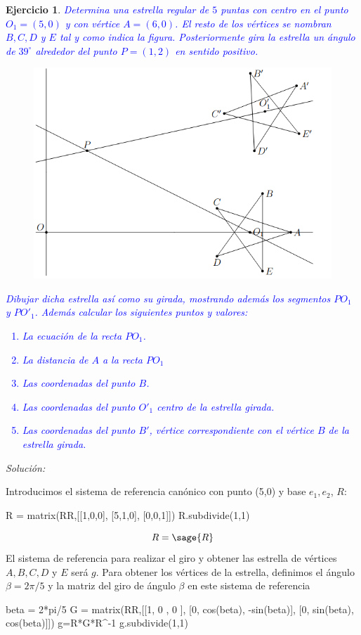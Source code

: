 \documentclass{amsart}
\newtheorem{ejer}{Ejercicio}
\begin{document}
\begin{ejer}
\textcolor{blue}{Determina una estrella regular de $5$ puntas con centro en el punto $O_1 = (5,0)$ y con vértice $A = (6,0)$. El resto de los vértices se nombran $B, C, D$ y $E$ tal y como indica la figura. Posteriormente gira la estrella un ángulo de $39^\circ $ alrededor del punto $P = (1,2)$ en sentido positivo.}

\begin{figure}[H]
\centering
\includegraphics[width = 12cm]{estrella1.png}
\end{figure}

\textcolor{blue}{Dibujar dicha estrella así como su girada, mostrando además los segmentos $PO_1$ y $PO'_1$. Además calcular los siguientes puntos y valores:
\begin{enumerate} 
\item[a)] La ecuación de la recta $PO_1$.
\item[b)] La distancia de $A$ a la recta $PO_1$
\item[c)] Las coordenadas del punto $B$.
\item[d)] Las coordenadas del punto $O'_1$ centro de la estrella girada.
\item[e)] Las coordenadas del punto $B'$, vértice correspondiente con el vértice $B$ de la estrella girada.
\end{enumerate}}

\end{ejer}

{\it Solución:}


Introducimos el sistema de referencia canónico con punto (5,0) y base $e_1,e_2$, $R$:
\begin{sageblock}
R = matrix(RR,[[1,0,0],
            [5,1,0],
            [0,0,1]])
R.subdivide(1,1)
\end{sageblock}
$$R=\sage{R}$$
El sistema de referencia para realizar el giro y obtener las estrella de vértices $A, B, C, D$ y $E$ será $g$. Para obtener los vértices de la estrella, definimos el ángulo $\beta = 2\pi/5$ y la matriz del giro de ángulo $\beta$ en este sistema de referencia
\begin{sageblock}
beta = 2*pi/5
G = matrix(RR,[[1, 0     ,  0      ],
            [0, cos(beta), -sin(beta)],
            [0, sin(beta),  cos(beta)]])
g=R*G*R^-1
g.subdivide(1,1)
\end{sageblock}
\end{document}
